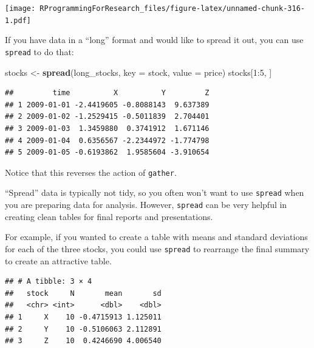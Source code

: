 \documentclass[]{book}
\makeatletter
\newenvironment{Shaded}{\begin{snugshade}}{\end{snugshade}}
\newcommand{\KeywordTok}[1]{\textcolor[rgb]{0.13,0.29,0.53}{\textbf{{#1}}}}
\newcommand{\DataTypeTok}[1]{\textcolor[rgb]{0.13,0.29,0.53}{{#1}}}
\newcommand{\DecValTok}[1]{\textcolor[rgb]{0.00,0.00,0.81}{{#1}}}
\newcommand{\StringTok}[1]{\textcolor[rgb]{0.31,0.60,0.02}{{#1}}}
\newcommand{\NormalTok}[1]{{#1}}
\newenvironment{kframe}{%
\medskip{}
\setlength{\fboxsep}{.8em}
 \def\at@end@of@kframe{}%
 \ifinner\ifhmode%
  \def\at@end@of@kframe{\end{minipage}}%
  \begin{minipage}{\columnwidth}%
 \fi\fi%
 \def\FrameCommand##1{\hskip\@totalleftmargin \hskip-\fboxsep
 \colorbox{shadecolor}{##1}\hskip-\fboxsep
     \hskip-\linewidth \hskip-\@totalleftmargin \hskip\columnwidth}%
 \MakeFramed {\advance\hsize-\width
   \@totalleftmargin\z@ \linewidth\hsize
   \@setminipage}}%
 {\par\unskip\endMakeFramed%
 \at@end@of@kframe}
\renewenvironment{Shaded}{\begin{kframe}}{\end{kframe}}
\makeatother
\begin{document}
\texttt{[image: RProgrammingForResearch\_files/figure-latex/unnamed-chunk-316-1.pdf]}

If you have data in a ``long'' format and would like to spread it out,
you can use \texttt{spread} to do that:

\begin{Shaded}
\begin{Highlighting}[]
\NormalTok{stocks <-}\StringTok{ }\KeywordTok{spread}\NormalTok{(long_stocks, }\DataTypeTok{key =} \NormalTok{stock, }\DataTypeTok{value =} \NormalTok{price)}
\NormalTok{stocks[}\DecValTok{1}\NormalTok{:}\DecValTok{5}\NormalTok{, ]}
\end{Highlighting}
\end{Shaded}

\begin{verbatim}
##         time          X          Y         Z
## 1 2009-01-01 -2.4419605 -0.8088143  9.637389
## 2 2009-01-02 -1.2529415 -0.5011839  2.704401
## 3 2009-01-03  1.3459880  0.3741912  1.671146
## 4 2009-01-04  0.6356567 -2.2344972 -1.774798
## 5 2009-01-05 -0.6193862  1.9585604 -3.910654
\end{verbatim}

Notice that this reverses the action of \texttt{gather}.

``Spread'' data is typically not tidy, so you often won't want to use
\texttt{spread} when you are preparing data for analysis. However,
\texttt{spread} can be very helpful in creating clean tables for final
reports and presentations.

For example, if you wanted to create a table with means and standard
deviations for each of the three stocks, you could use \texttt{spread}
to rearrange the final summary to create an attractive table.

\begin{Shaded}
\end{Shaded}

\begin{verbatim}
## # A tibble: 3 × 4
##   stock     N       mean       sd
##   <chr> <int>      <dbl>    <dbl>
## 1     X    10 -0.4715913 1.125011
## 2     Y    10 -0.5106063 2.112891
## 3     Z    10  0.4246690 4.006540
\end{verbatim}
\end{document}
